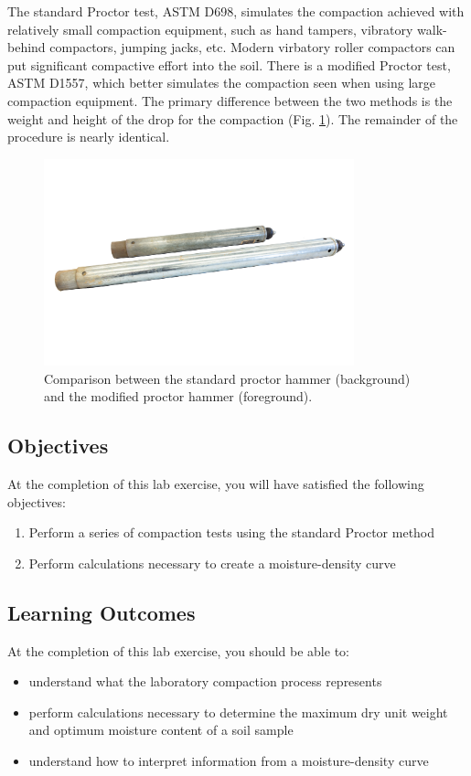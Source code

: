 \documentclass[12pt]{article}
\begin{document}
The standard Proctor test, ASTM D698, simulates the compaction achieved with relatively small compaction equipment, such as hand tampers, vibratory walk-behind compactors, jumping jacks, etc. Modern virbatory roller compactors can put significant compactive effort into the soil. There is a modified Proctor test, ASTM D1557, which better simulates the compaction seen when using large compaction equipment. The primary difference between the two methods is the weight and height of the drop for the compaction (Fig. \ref{fig:proctorhammer}). The remainder of the procedure is nearly identical.

\begin{figure}[H]
    \centering
    \includegraphics[width=0.8\textwidth]{GEO_5756.jpg}
    \caption{Comparison between the standard proctor hammer (background) and the modified proctor hammer (foreground).}
    \label{fig:proctorhammer}
\end{figure}

\subsection{Objectives}
\label{ssec:headingscap}
At the completion of this lab exercise, you will have satisfied the following objectives:
\begin{enumerate}
    \item Perform a series of compaction tests using the standard Proctor method
    \item Perform calculations necessary to create a moisture-density curve
\end{enumerate}

\subsection{Learning Outcomes}
At the completion of this lab exercise, you should be able to:
\begin{itemize}
    \item understand what the laboratory compaction process represents
    \item perform calculations necessary to determine the maximum dry unit weight and optimum moisture content of a soil sample
    \item understand how to interpret information from a moisture-density curve
\end{itemize}
\end{document}
